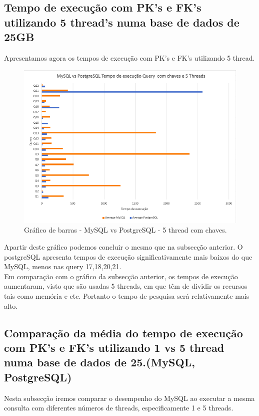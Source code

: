 \documentclass{article}
\begin{document}
\clearpage
\subsection{Tempo de execução com PK's e FK's utilizando 5 thread's numa base
de dados de 25GB}
Apresentamos agora os tempos de execução com PK's e FK's utilizando 5 thread.
\begin{figure}[H]
  \centering
  \includegraphics[width=\textwidth]{Graphs/mysqlvspostgres5thread.png}
  \caption{Gráfico de barras - MySQL vs PostgreSQL - 5 thread com chaves.}
  \label{fig:PKCreation2}
\end{figure}


\quad Apartir deste gráfico podemos concluir o mesmo que na subsecção anterior. O postgreSQL apresenta tempos de execução significativamente mais baixos do que MySQL, menos nas query 17,18,20,21.\\

\quad Em comparação com o gráfico da subsecção anterior, os tempos de execução aumentaram, visto que são usadas 5 threads, em que têm de dividir os recursos tais como memória e etc. Portanto o tempo de pesquisa será relativamente mais alto.
\clearpage
  \subsection{Comparação da média do tempo de execução com PK's e FK's
  utilizando 1 vs 5 thread numa base de dados de 25.(MySQL, PostgreSQL)}
  
  \quad Nesta subsecção iremos comparar o desempenho do MySQL ao executar a mesma consulta com diferentes números de threads, especificamente 1 e 5 threads. 
  
\end{document}
